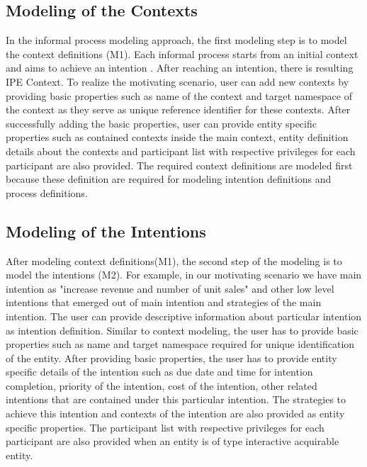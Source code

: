 \subsection{Modeling of the Contexts}
In the informal process modeling approach, the first modeling step is to model the context definitions (M1). Each informal process starts from an initial context and aims to achieve an intention \cite{Sungur2014a}. After reaching an intention, there is resulting IPE Context. To realize the motivating scenario, user can add new contexts by providing basic properties such as name of the context and target namespace of the context as they serve as unique reference identifier for these contexts. After successfully adding the basic properties, user can provide entity specific properties such as contained contexts inside the main context, entity definition details about the contexts and participant list with respective privileges for each participant are also provided. The required context definitions are modeled first because these definition are required for modeling intention definitions and process definitions.  

\subsection{Modeling of the Intentions}
After modeling context definitions(M1), the second step of the modeling is to model the intentions (M2). For example, in our motivating scenario we have main intention as "increase revenue and number of unit sales" and other low level intentions that emerged out of main intention and strategies of the main intention. The user can provide descriptive information about particular intention as intention definition. Similar to context modeling, the user has to provide basic properties such as name and target namespace required for unique identification of the entity. After providing basic properties, the user has to provide entity specific details of the intention such as due date and time for intention completion, priority of the intention, cost of the intention, other related intentions that are contained under this particular intention. The strategies to achieve this intention and contexts of the intention are also provided as entity specific properties. The participant list with respective privileges for each participant are also provided when an entity is of type interactive acquirable entity. 


